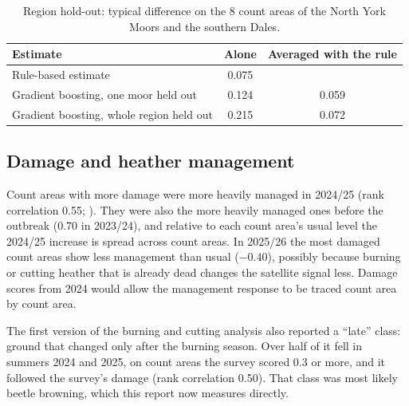 \documentclass[11pt,a4paper]{article}
\begin{document}
\begin{table}[htbp]
\centering
\caption{Region hold-out: typical difference on the 8 count areas of the North York Moors and the southern Dales.}\label{tab:region}
\small
\begin{tabular}{lcc}
\toprule
Estimate & Alone & Averaged with the rule \\
\midrule
Rule-based estimate & 0.075 & \\
Gradient boosting, one moor held out & 0.124 & 0.059 \\
Gradient boosting, whole region held out & 0.215 & 0.072 \\
\bottomrule
\end{tabular}
\end{table}

\subsection{Damage and heather management}\label{sec:management}

\begin{table}[htbp]
\centering
\caption{Rank correlation between surveyed damage and the percentage of each count area burnt or cut, by season, and with the change from each count area's usual level (mean of 2017/18 to 2023/24).}\label{tab:management}
\small

\end{table}

Count areas with more damage were more heavily managed in 2024/25 (rank correlation 0.55; ). They were also the more heavily managed ones before the outbreak (0.70 in 2023/24), and relative to each count area's usual level the 2024/25 increase is spread across count areas. In 2025/26 the most damaged count areas show less management than usual ($-0.40$), possibly because burning or cutting heather that is already dead changes the satellite signal less. Damage scores from 2024 would allow the management response to be traced count area by count area.

The first version of the burning and cutting analysis also reported a ``late'' class: ground that changed only after the burning season. Over half of it fell in summers 2024 and 2025, on count areas the survey scored 0.3 or more, and it followed the survey's damage (rank correlation 0.50). That class was most likely beetle browning, which this report now measures directly.

\FloatBarrier
\end{document}
